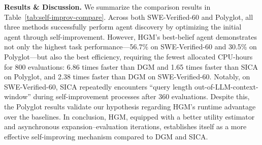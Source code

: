 \documentclass{article}
\begin{document}
\begin{table}[t!]
  \centering
  \label{tab:self-improv-compare}
  \renewcommand\arraystretch{1.2} 
\end{table}

\textbf{Results \& Discussion.} We summarize the comparison results in Table~\ref{tab:self-improv-compare}. Across both SWE-Verified-60 and Polyglot, all three methods successfully perform agent discovery by optimizing the initial agent through self-improvement. However, HGM’s best-belief agent demonstrates not only the highest task performance---56.7\% on SWE-Verified-60 and 30.5\% on Polyglot---but also the best efficiency, requiring the fewest allocated CPU-hours for 800 evaluations: 6.86 times faster than DGM and 1.65 times faster than SICA on Polyglot, and 2.38 times faster than DGM on SWE-Verified-60. Notably, on SWE-Verified-60, SICA repeatedly encounters ``query length out-of-LLM-context-window'' during self-improvement processes after 360 evaluations. Despite this, the Polyglot results validate our hypothesis regarding HGM’s runtime advantage over the baselines. In conclusion, HGM, equipped with a better utility estimator and asynchronous expansion–evaluation iterations, establishes itself as a more effective self-improving mechanism compared to DGM and SICA.
\end{document}
